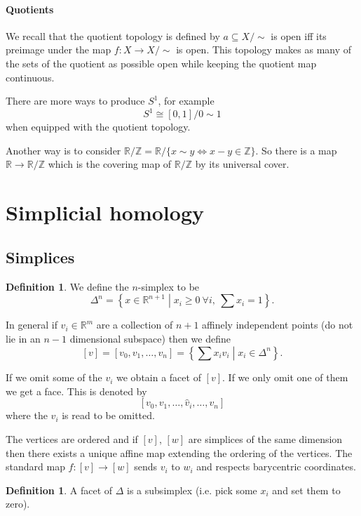 \documentclass[12pt]{article}
\theoremstyle{definition}
\theoremstyle{definition}
\newtheorem{defn}[thm]{Definition}
\newcommand{\ZZ}{\mathbb{Z}}
\newcommand{\RR}{\mathbb{R}}
\begin{document}
\paragraph{Quotients}
We recall that the quotient topology is defined by $a \subseteq X/\sim$ is open iff its preimage under the map $f\colon X \to X/\sim$ is open.
This topology makes as many of the sets of the quotient as possible open while keeping the quotient map continuous.

There are more ways to produce $S^1$, for example
\[S^1 \cong [0,1]/0\sim1\]
when equipped with the quotient topology.

Another way is to consider $\RR/\ZZ = \RR/\{x\sim y \iff x-y\in \ZZ\}$.
So there is a map $\RR \to \RR/\ZZ$ which is the covering map of $\RR/\ZZ$ by its universal cover.

\section{Simplicial homology}
\subsection{Simplices}
\begin{defn}
We define the $n$-simplex to be
\[\Delta^n = \left\{x\in \RR^{n+1} \middle| x_i \ge 0\ \forall i,\ \sum x_i = 1\right\}.\]
\end{defn}


In general if $v_i\in \RR^m$ are a collection of $n+1$ affinely independent points (do not lie in an $n-1$ dimensional subspace) then we define
\[[v] = [v_0,v_1,\ldots,v_n] = \left\{\sum x_i v_i \middle| x_i\in \Delta^n\right\}.\]


If we omit some of the $v_i$ we obtain a facet of $[v]$.
If we only omit one of them we get a face.
This is denoted by
\[[v_0,v_1, \ldots, \hat v_i, \ldots , v_n]\]
where the $v_i$ is read to be omitted.

The vertices are ordered and if $[v]$, $[w]$ are simplices of the same dimension then there exists a unique affine map extending the ordering of the vertices.
The standard map $f\colon [v]\to [w]$ sends $v_i$ to $w_i$ and respects barycentric coordinates. 


\begin{defn}
A facet of $\Delta$ is a subsimplex (i.e. pick some $x_i$ and set them to zero).
\end{defn}
\end{document}
